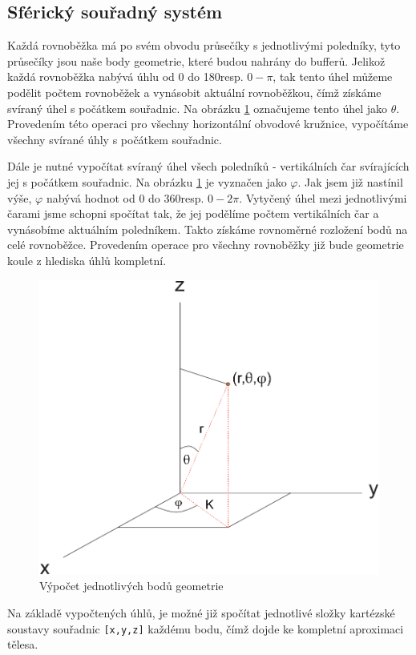 \subsection{Sférický souřadný systém}

Každá rovnoběžka má po svém obvodu průsečíky s jednotlivými poledníky, tyto průsečíky jsou naše body geometrie, které budou nahrány do bufferů. Jelikož každá rovnoběžka nabývá úhlu od 0 do 180\degree  resp. $0-\pi$, tak tento úhel můžeme podělit počtem rovnoběžek a vynásobit aktuální rovnoběžkou, čímž získáme svíraný úhel s počátkem souřadnic. Na obrázku \ref{fig:geom} označujeme tento úhel jako $\theta$. Provedením této operaci pro všechny horizontální obvodové kružnice, vypočítáme všechny svírané úhly s počátkem souřadnic. 

Dále je nutné vypočítat svíraný úhel všech poledníků - vertikálních čar svírajících jej s počátkem souřadnic. Na obrázku \ref{fig:geom} je vyznačen jako $\varphi$. Jak jsem již nastínil výše, $\varphi$ nabývá hodnot od 0 do 360\degree resp. $0-2\pi$. Vytyčený úhel mezi jednotlivými čarami jsme schopni spočítat tak, že jej podělíme počtem vertikálních čar a vynásobíme aktuálním poledníkem. Takto získáme rovnoměrné rozložení bodů na celé rovnoběžce. Provedením  operace pro všechny rovnoběžky již bude geometrie koule z hlediska úhlů kompletní.

\begin{figure}[h]
	\label{img:2}
	\centering
	\includegraphics[scale=1.0,angle=0,width=0.6\linewidth]{obrazky-figures/geometry}
	\caption{Výpočet jednotlivých bodů geometrie}
	\label{fig:geom}
\end{figure}
 
Na základě vypočtených úhlů, je možné již spočítat jednotlivé složky kartézské soustavy souřadnic \texttt{[x,y,z]} každému bodu, čímž dojde ke kompletní aproximaci tělesa.

